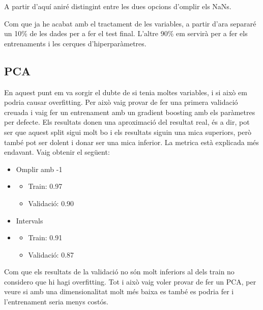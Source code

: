 \documentclass[9pt,a4paper,twoside]{tau-class/tau}
\begin{document}
    A partir d'aquí aniré distingint entre les dues opcions d'omplir els NaNs.

    Com que ja he acabat amb el tractament de les variables, a partir d'ara separaré un 10\% de les dades per a fer el test final. L'altre 90\% em servirà per a fer els entrenaments i les cerques d'hiperparàmetres.

    \subsection{PCA}
    En aquest punt em va sorgir el dubte de si tenia moltes variables, i si això em podria causar overfitting. Per això vaig provar de fer una primera validació creuada i vaig fer un entrenament amb un gradient boosting amb els paràmetres per defecte. Els resultats donen una aproximació del resultat real, és a dir, pot ser que aquest split sigui molt bo i els resultats siguin una mica superiors, però també pot ser dolent i donar ser una mica inferior.
    La metrica està explicada més endavant. Vaig obtenir el següent:
    \begin{itemize}
        \item Omplir amb -1
        \item \begin{itemize}
            \item Train: 0.97
            \item Validació: 0.90
        \end{itemize}
        \item Intervals
        \item \begin{itemize}
            \item Train: 0.91
            \item Validació: 0.87
        \end{itemize}
    \end{itemize}
    Com que els resultats de la validació no són molt inferiors al dels train no considero que hi hagi overfitting. Tot i això vaig voler provar de fer un PCA, per veure si amb una dimensionalitat molt més baixa es també es podria fer i l'entrenament seria menys costós.
\end{document}
